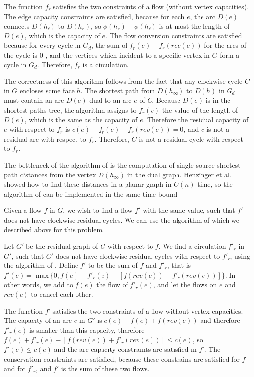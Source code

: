 \documentclass[a4paper,11pt]{article}
\begin{document}
The function $f_r$ satisfies the two constraints of a flow \cite{KNK93} (without vertex
capacities). The edge capacity constraints are satisfied, because for each $e$,
the arc $D(e)$ connects $D(h_\ell)$ to $D(h_r)$, so $\phi(h_r) - \phi(h_\ell)$ is
at most the length of $D(e)$, which is the capacity of $e$.
The flow conversion constraints are satisfied because for every cycle in $G_d$,
the sum of $f_r(e) - f_r(rev(e))$ for the arcs of the cycle is $0$ \cite{H81,J87}, and the
vertices which incident to a specific vertex in $G$ form a cycle in $G_d$.
Therefore, $f_r$ is a circulation.

The correctness of this algorithm follows from the fact that any clockwise
cycle $C$ in $G$ encloses some face $h$. The shortest path from $D(h_\infty)$
to $D(h)$ in $G_d$ must contain an arc $D(e)$
dual to an arc $e$ of $C$. Because $D(e)$ is in the shortest paths tree, the
algorithm assigns to $f_r(e)$ the value of the length of $D(e)$, which is
the same as the capacity of $e$. Therefore the residual
capacity of $e$ with respect to $f_r$ is $c(e) - f_r(e) + f_r(rev(e)) = 0$,
and $e$ is not a residual arc with respect to $f_r$. Therefore, $C$ is not
a residual cycle with respect to $f_r$.

The bottleneck of the algorithm of \cite{KNK93} is the
computation of single-source shortest-path distances from the vertex
$D(h_\infty)$ in the dual graph. Henzinger
et al.~\cite{HKRS97} showed how to find these distances in a planar
graph in $O(n)$ time, so the algorithm of \cite{KNK93}
can be implemented in the same time bound.

Given a flow $f$ in $G$, we wish to find a flow $f'$ with the same value, such
that $f'$ does not have clockwise residual cycles. We can use the algorithm
of \cite{KNK93} which we described above for this problem.

Let $G'$ be the residual graph of $G$ with respect to $f$. We find a
circulation $f'_r$ in $G'$, such that $G'$ does not have clockwise
residual cycles with respect to $f'_r$, using the algorithm of \cite{KNK93}. Define
$f'$ to be the sum of $f$ and $f'_r$, that is $f'(e) = \max\{0, f(e) + f'_r(e) - [f(rev(e)) + f'_r(rev(e))]\}$.
In other words, we add to $f(e)$ the flow of $f'_r(e)$, and let the flows
on $e$ and $rev(e)$ to cancel each other.

The function $f'$ satisfies the two constraints of a flow without vertex
capacities. The capacity of an arc
$e$ in $G'$ is $c(e) - f(e) + f(rev(e))$ and therefore $f'_r(e)$ is
smaller than this capacity, therefore $f(e) + f'_r(e) - [f(rev(e)) + f'_r(rev(e))]
\leq c(e)$, so $f'(e) \leq c(e)$ and the arc capacity constraints are satisfied in $f'$.
The conservation constraints are satisfied, because these constrains
are satisfied for $f$ and for $f'_r$, and $f'$ is the sum of these two flows.
\end{document}

